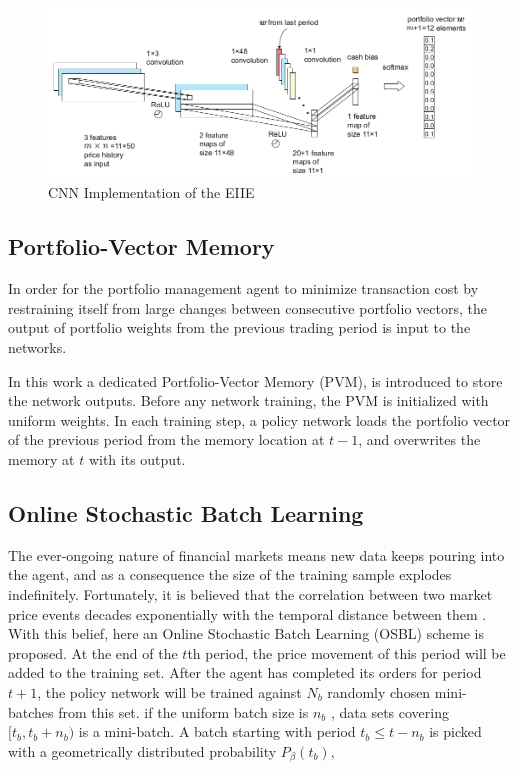 \documentclass[journal,onecolumn]{IEEEtran}
\begin{document}
\begin{figure}[!t]
\centering
\includegraphics[width=0.8\linewidth]{CNN.png}
\caption{CNN Implementation of the EIIE}
\label{fig_sim}
\end{figure}
\subsection{Portfolio-Vector Memory}
In order for the portfolio management agent to minimize transaction cost by restraining itself from large changes between consecutive portfolio vectors, the output of portfolio weights from the previous trading period is input to the networks.

In this work a dedicated Portfolio-Vector Memory (PVM), is introduced to store the network outputs. Before any network training, the PVM is initialized with uniform weights. In each training step, a policy network loads the portfolio vector of the previous period from the memory location at $t - 1$, and overwrites the memory at $t$ with its output.
\subsection{Online Stochastic Batch Learning}
The ever-ongoing nature of financial markets means new data keeps pouring into the agent, and as a consequence the size of the training sample explodes indefinitely. Fortunately, it is believed that the correlation between two market price events decades exponentially with the temporal distance between them \cite{Holt2004}. With this belief, here an Online Stochastic Batch Learning (OSBL) scheme is proposed.
At the end of the $t$th period, the price movement of this period will be added to the training set. After the agent has completed its orders for period $t + 1$, the policy network will be trained against $N_b$ randomly chosen mini-batches from this set. if the uniform batch size is $n_b$ , data sets covering $[t_b , t_b + n_b )$ is a mini-batch. A batch starting with period $t_b \le t - n_b$ is picked with a geometrically distributed probability $P_{\beta}(t_b)$,
\end{document}
